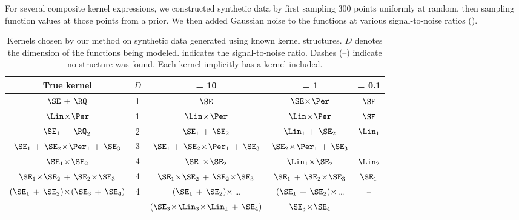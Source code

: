 For several composite kernel expressions, we constructed synthetic data by first sampling 300 points uniformly at random, then sampling function values at those points from a \gp{} prior.
We then added \iid Gaussian noise to the functions at various signal-to-noise ratios (\SNR{}).


\begin{table}[ht!]
\caption[Kernels recovered on synthetic data]
{
Kernels chosen by our method on synthetic data generated using known kernel structures. $D$ denotes the dimension of the functions being modeled.
\SNR{} indicates the signal-to-noise ratio.
Dashes (--) indicate no structure was found.
Each kernel implicitly has a \kWN{} kernel included.
}
\label{tbl:synthetic}
\addtolength{\tabcolsep}{1pt}
\setlength\extrarowheight{2pt}
\begin{center}
{\small
\begin{tabular}{c c | c c c}
True kernel & $D$ & \SNR{} = 10 & \SNR{} = 1 & \hspace{-1cm} \SNR{} = 0.1 \\
\hline
$\SE \kernplus \RQ$        & 1 & $\SE$ & $\SE \kerntimes \Per$ & $\SE$ \\
$\Lin \kerntimes \Per$ & 1 & $\Lin \kerntimes \Per$ & $\Lin \kerntimes \Per$ & $\SE$ \\
$\SE_1 \kernplus \RQ_2$    & 2 & $\SE_1 \kernplus \SE_2$ & $\Lin_1 \kernplus \SE_2$ & $\Lin_1$ \\
$\SE_1 \kernplus \SE_2 \kerntimes \Per_1 \kernplus \SE_3$ & 3 & $\SE_1 \kernplus \SE_2 \kerntimes \Per_1 \kernplus \SE_3$ & $\SE_2 \kerntimes \Per_1 \kernplus \SE_3$ & -- \\
$\SE_1 \kerntimes \SE_2$ & 4 & $\SE_1 \kerntimes \SE_2$ & $\Lin_1 \kerntimes \SE_2$ & $\Lin_2$ \\
$\SE_1 \kerntimes \SE_2 \kernplus \SE_2 \kerntimes \SE_3$ & 4 & $\SE_1 \kerntimes \SE_2 \kernplus \SE_2 \kerntimes \SE_3$ & $\SE_1 \kernplus \SE_2 \kerntimes \SE_3$ & $\SE_1$ \\
\multirow{2}{*}{ $(\SE_1 \kernplus \SE_2) \kerntimes (\SE_3 \kernplus \SE_4)$ } & \multirow{2}{*}{4} & $(\SE_1 \kernplus \SE_2) \, \kerntimes$ \dots & $(\SE_1 \kernplus \SE_2) \, \kerntimes$ \dots & \multirow{2}{*}{--} \\
 & & $(\SE_3\kerntimes\Lin_3\kerntimes\Lin_1 \kernplus \SE_4)$ & $\SE_3 \kerntimes \SE_4$ &
\end{tabular}
}
\end{center}
\end{table}


